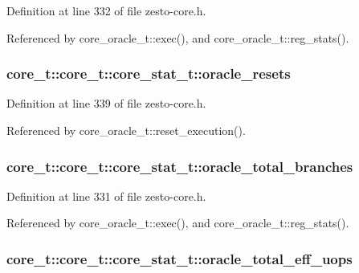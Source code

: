 Definition at line 332 of file zesto-core.h.

Referenced by core\_\-oracle\_\-t::exec(), and core\_\-oracle\_\-t::reg\_\-stats().
\subsubsection[{oracle\_\-resets}]{ core\_\-t::core\_\-t::core\_\-stat\_\-t::oracle\_\-resets}\label{structcore__t_1_1core__stat__t_6f1c10a0ec011ec2b106084c7be4f640}




Definition at line 339 of file zesto-core.h.

Referenced by core\_\-oracle\_\-t::reset\_\-execution().
\subsubsection[{oracle\_\-total\_\-branches}]{ core\_\-t::core\_\-t::core\_\-stat\_\-t::oracle\_\-total\_\-branches}\label{structcore__t_1_1core__stat__t_437c271d49060c1283eb8a894ca5dda4}




Definition at line 331 of file zesto-core.h.

Referenced by core\_\-oracle\_\-t::exec(), and core\_\-oracle\_\-t::reg\_\-stats().
\subsubsection[{oracle\_\-total\_\-eff\_\-uops}]{ core\_\-t::core\_\-t::core\_\-stat\_\-t::oracle\_\-total\_\-eff\_\-uops}\label{structcore__t_1_1core__stat__t_8c9802fcef07a9344070d45736f9af17}





